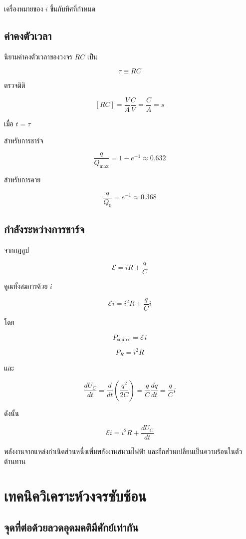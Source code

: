 เครื่องหมายของ $i$ ขึ้นกับทิศที่กำหนด

\subsection{ค่าคงตัวเวลา}

นิยามค่าคงตัวเวลาของวงจร $RC$ เป็น

\[
\boxed{\tau\equiv RC}
\]

ตรวจมิติ

\[
[RC]=\frac{\si{V}}{\si{A}}\frac{\si{C}}{\si{V}}
=\frac{\si{C}}{\si{A}}
=\si{s}
\]

เมื่อ $t=\tau$

สำหรับการชาร์จ

\[
\frac{q}{Q_{\max}}=1-e^{-1}\approx 0.632
\]

สำหรับการคาย

\[
\frac{q}{Q_0}=e^{-1}\approx 0.368
\]

\subsection{กำลังระหว่างการชาร์จ}

จากกฎลูป

\[
\mathcal{E}=iR+\frac{q}{C}
\]

คูณทั้งสมการด้วย $i$

\[
\mathcal{E}i=i^2R+\frac{q}{C}i
\]

โดย

\[
P_{\text{source}}=\mathcal{E}i
\]

\[
P_R=i^2R
\]

และ

\[
\frac{dU_C}{dt}
=\frac{d}{dt}\left(\frac{q^2}{2C}\right)
=\frac{q}{C}\frac{dq}{dt}
=\frac{q}{C}i
\]

ดังนั้น

\begin{tcolorbox}[title={การอนุรักษ์กำลังในวงจร RC}]
\[
\boxed{\mathcal{E}i=i^2R+\frac{dU_C}{dt}}
\]
\end{tcolorbox}

พลังงานจากแหล่งกำเนิดส่วนหนึ่งเพิ่มพลังงานสนามไฟฟ้า และอีกส่วนเปลี่ยนเป็นความร้อนในตัวต้านทาน

\section{เทคนิควิเคราะห์วงจรซับซ้อน}

\subsection{จุดที่ต่อด้วยลวดอุดมคติมีศักย์เท่ากัน}

